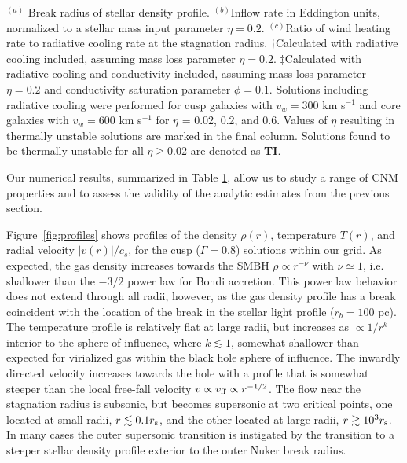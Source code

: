 \documentclass[usenatbib,fleqn]{mn2e}
\newcommand{\rb}{r_b}
\newcommand{\densSlope}{\nu}
\begin{document}
\begin{table}
\begin{threeparttable}
\begin{minipage}{18cm}
\begin{tabular}{lccccccccc}
\label{table:models}  
\end{tabular}
\begin{tablenotes}
\item $^{(a)}$ Break radius of stellar density profile.
  $^{(b)}$Inflow rate in Eddington units, normalized to a stellar mass
  input parameter $\eta = 0.2$.  $^{(c)}$Ratio of wind heating rate to
  radiative cooling rate at the stagnation radius. $\dagger$Calculated
  with radiative cooling included, assuming mass loss parameter $\eta
  = 0.2$.  $\ddagger$Calculated with radiative cooling and
  conductivity included, assuming mass loss parameter $\eta = 0.2$ and
  conductivity saturation parameter $\phi = 0.1$.  Solutions including
  radiative cooling were performed for cusp galaxies with $v_w=300 $
  km s$^{-1}$ and core galaxies with $v_w=600 $ km s$^{-1}$ for $\eta$
  = 0.02, 0.2, and 0.6.  Values of $\eta$ resulting in thermally
  unstable solutions are marked in the final column.  Solutions found
  to be thermally unstable for all $\eta \geq 0.02$ are denoted as
  {\bf TI}.
\end{tablenotes}
\end{minipage}
\end{threeparttable}

\end{table}



Our numerical results, summarized in Table \ref{table:models}, allow
us to study a range of CNM properties and to assess the validity of
the analytic estimates from the previous section.  

Figure~\ref{fig:profiles} shows profiles of the density $\rho(r)$,
temperature $T(r)$, and radial velocity $|v(r)|/c_s$, for the cusp
($\Gamma=0.8$) solutions within our grid.  As expected, the gas
density increases towards the SMBH $\rho\propto r^{-\densSlope}$ with
$\densSlope\simeq1$, i.e. shallower than the $-3/2$ power law for
Bondi accretion. This power law behavior does not extend through all
radii, however, as the gas density profile has a break coincident with
the location of the break in the stellar light profile ($\rb=100$
pc). The temperature profile is relatively flat at large radii, but
increases as $\propto 1/r^{k}$ interior to the sphere of influence,
where $k\lesssim 1$, somewhat shallower than expected for virialized
gas within the black hole sphere of influence.  The inwardly directed
velocity increases towards the hole with a profile that is somewhat
steeper than the local free-fall velocity $v \propto v_{\rm ff}\propto
r^{-1/2}$.  The flow near the stagnation radius is subsonic, but
becomes supersonic at two critical points, one located at small radii,
$r \lesssim 0.1r_{\rm s}$, and the other located at large radii, $r
\gtrsim 10^{3}r_{\rm s}$.  In many cases the outer supersonic
transition is instigated by the transition to a steeper stellar
density profile exterior to the outer Nuker break radius.
\end{document}
